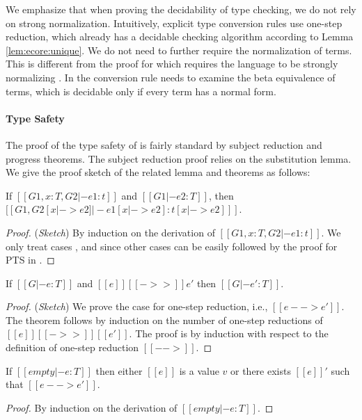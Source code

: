 We emphasize that when proving the decidability of type checking, we
do not rely on strong normalization. Intuitively,
explicit type conversion rules use one-step reduction, which already
has a decidable checking algorithm according to Lemma
\ref{lem:ecore:unique}. We do not need to further require the
normalization of terms. This is different from the proof for \cc which
requires the language to be strongly normalizing
\cite{pts:normalize}. In \cc the conversion rule needs to examine
the beta equivalence of terms, which is decidable only if every term
has a normal form.

\paragraph{Type Safety}
The proof of the type safety of \name is fairly standard by subject
reduction and progress theorems. The subject reduction proof relies on
the substitution lemma. We give the proof sketch of the related lemma and
theorems as follows:

\begin{lemma}[Substitution]\label{lem:ecore:subst}
	If $[[G1, x:T, G2 |- e1:t]]$ and $[[G1 |- e2:T]]$, then $[[G1, G2 [x |-> e2]
|- e1[x |-> e2]  : t[x |-> e2] ]]$.
\end{lemma}

\begin{proof}
    (\emph{Sketch}) By induction on the derivation of $[[G1, x:T, G2 |- e1:t]]$. We only treat cases ,  and  since other cases can be easily followed by the proof for PTS in \cite{handbook}.
\end{proof}

\begin{theorem}\label{lem:ecore:reduct}
If $[[G |- e:T]]$ and $[[e]] [[->>]] e'$ then $[[G |- e':T]]$.
\end{theorem}

\begin{proof}
    (\emph{Sketch}) We prove the case for one-step reduction, i.e., $[[e -->
e']]$. The theorem follows by induction on the number of one-step reductions
of $[[e]] [[->>]] [[e']]$.
    The proof is by induction with respect to the definition of one-step
reduction $[[-->]]$.
\end{proof}

\begin{theorem}\label{lem:ecore:prog}
If $[[empty |- e:T]]$ then either $[[e]]$ is a value $v$ or there exists $[[e]]'$
such that $[[e --> e']]$.
\end{theorem}

\begin{proof}
    By induction on the derivation of $[[empty |- e:T]]$.
\end{proof}
